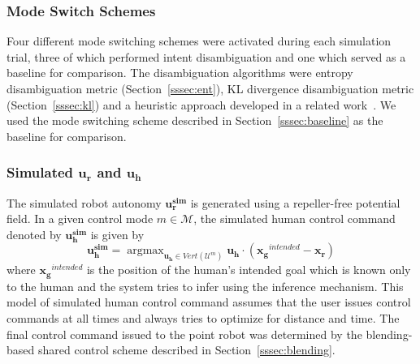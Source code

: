 \documentclass[conference]{IEEEtran}
\DeclareMathOperator*{\argmax}{argmax}
\begin{document}
\subsubsection{Mode Switch Schemes}
Four different mode switching schemes were activated during each simulation trial, three of which performed intent disambiguation and one which served as a baseline for comparison. The disambiguation algorithms were entropy disambiguation  metric (Section~\ref{sssec:ent}), KL divergence disambiguation metric (Section~\ref{sssec:kl}) and a heuristic approach developed in a related work~\citep{gopinath2017mode}. We used the mode switching scheme described in Section~\ref{sssec:baseline} as the baseline for comparison. 
\subsubsection{Simulated $\boldsymbol{u_r}$ and $\boldsymbol{u_h}$}
The simulated robot autonomy $\boldsymbol{u^{sim}_r}$ is generated using a repeller-free potential field. In a given control mode $m \in \mathcal{M}$, the simulated human control command denoted by $\boldsymbol{u^{sim}_h}$ is given by
\begin{equation*}
\boldsymbol{u^{sim}_h} = \argmax_{\boldsymbol{u_h} \in Vert(\mathcal{U}^m)} \boldsymbol{u_h}\cdot(\boldsymbol{x_g}^{intended} - \boldsymbol{x_r})
\end{equation*}
where $\boldsymbol{x_g}^{intended}$ is the position of the human's intended goal which is known only to the human and the system tries to infer using the inference mechanism. This model of simulated human control command assumes that the user issues control commands at all times and always tries to optimize for distance and time. The final control command issued to the point robot was determined by the blending-based shared control scheme described in Section~\ref{sssec:blending}.
\end{document}
